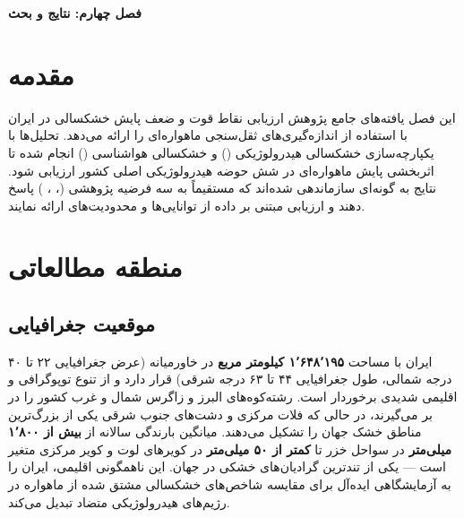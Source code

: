 \documentclass[12pt, a4paper]{article}
\begin{document}
\begin{center}
  {\LARGE\textbf{فصل چهارم: نتایج و بحث}}
\end{center}
\label{ch:results}

\section{مقدمه}
\label{sec:4-1}

این فصل یافته‌های جامع پژوهش ارزیابی نقاط قوت و ضعف پایش خشکسالی در ایران با استفاده از
اندازه‌گیری‌های ثقل‌سنجی ماهواره‌ای  را ارائه می‌دهد. تحلیل‌ها با
یکپارچه‌سازی خشکسالی هیدرولوژیکی () و خشکسالی هواشناسی ()
انجام شده تا اثربخشی پایش ماهواره‌ای در شش حوضه هیدرولوژیکی اصلی کشور ارزیابی شود.
نتایج به گونه‌ای سازماندهی شده‌اند که مستقیماً به سه فرضیه پژوهشی
(، ، ) پاسخ دهند و ارزیابی مبتنی بر داده از توانایی‌ها و
محدودیت‌های  ارائه نمایند.

\section{منطقه مطالعاتی}
\label{sec:4-1a}

\subsection{موقعیت جغرافیایی}
\label{sec:4-1a-1}

ایران با مساحت \textbf{۱٬۶۴۸٬۱۹۵ کیلومتر مربع} در خاورمیانه (عرض جغرافیایی ۲۲ تا ۴۰
درجه شمالی، طول جغرافیایی ۴۴ تا ۶۳ درجه شرقی) قرار دارد و از تنوع توپوگرافی و اقلیمی
شدیدی برخوردار است. رشته‌کوه‌های البرز و زاگرس شمال و غرب کشور را در بر می‌گیرند، در
حالی که فلات مرکزی و دشت‌های جنوب شرقی یکی از بزرگ‌ترین مناطق خشک جهان را تشکیل
می‌دهند. میانگین بارندگی سالانه از \textbf{بیش از ۱٬۸۰۰ میلی‌متر} در سواحل خزر تا
\textbf{کمتر از ۵۰ میلی‌متر} در کویرهای لوت و کویر مرکزی متغیر است — یکی از تندترین
گرادیان‌های خشکی در جهان. این ناهمگونی اقلیمی، ایران را به آزمایشگاهی ایده‌آل برای
مقایسه شاخص‌های خشکسالی مشتق شده از ماهواره در رژیم‌های هیدرولوژیکی متضاد تبدیل
می‌کند.
\end{document}
